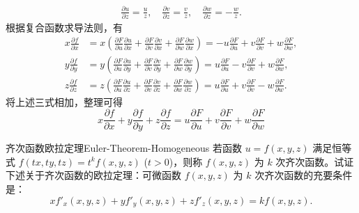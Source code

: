 \begin{myproof}
\begin{equation}
\begin{aligned}
            \frac{\partial u}{\partial z} = \frac{u}{z}, \quad \frac{\partial v}{\partial z} = \frac{v}{z}, \quad \frac{\partial w}{\partial z} = -\frac{w}{z}.
        \end{aligned}
    \end{equation}
    根据复合函数求导法则，有
    \begin{equation}
        \begin{aligned}
            x \frac{\partial f}{\partial x} & = x \left( \frac{\partial F}{\partial u} \frac{\partial u}{\partial x} + \frac{\partial F}{\partial v} \frac{\partial v}{\partial x} + \frac{\partial F}{\partial w} \frac{\partial w}{\partial x} \right) = -u \frac{\partial F}{\partial u} + v \frac{\partial F}{\partial v} + w \frac{\partial F}{\partial w}, \\
            y \frac{\partial f}{\partial y} & = y \left( \frac{\partial F}{\partial u} \frac{\partial u}{\partial y} + \frac{\partial F}{\partial v} \frac{\partial v}{\partial y} + \frac{\partial F}{\partial w} \frac{\partial w}{\partial y} \right) = u \frac{\partial F}{\partial u} - v \frac{\partial F}{\partial v} + w \frac{\partial F}{\partial w},  \\
            z \frac{\partial f}{\partial z} & = z \left( \frac{\partial F}{\partial u} \frac{\partial u}{\partial z} + \frac{\partial F}{\partial v} \frac{\partial v}{\partial z} + \frac{\partial F}{\partial w} \frac{\partial w}{\partial z} \right) = u \frac{\partial F}{\partial u} + v \frac{\partial F}{\partial v} - w \frac{\partial F}{\partial w}.
        \end{aligned}
    \end{equation}
    将上述三式相加，整理可得
    \begin{equation}
        \boxed{x \frac{\partial f}{\partial x} + y \frac{\partial f}{\partial y} + z \frac{\partial f}{\partial z} = u \frac{\partial F}{\partial u} + v \frac{\partial F}{\partial v} + w \frac{\partial F}{\partial w}}
    \end{equation}
\end{myproof}


\begin{problem}{齐次函数欧拉定理}{Euler-Theorem-Homogeneous}
    若函数 $u = f(x, y, z)$ 满足恒等式 $f(tx, ty, tz) = t^k f(x, y, z)$ ($t > 0$)，则称 $f(x, y, z)$ 为 $k$ 次齐次函数。试证下述关于齐次函数的欧拉定理：可微函数 $f(x, y, z)$ 为 $k$ 次齐次函数的充要条件是：
    \begin{equation}
        x f'_x(x, y, z) + y f'_y(x, y, z) + z f'_z(x, y, z) = k f(x, y, z).
    \end{equation}
\end{problem}

